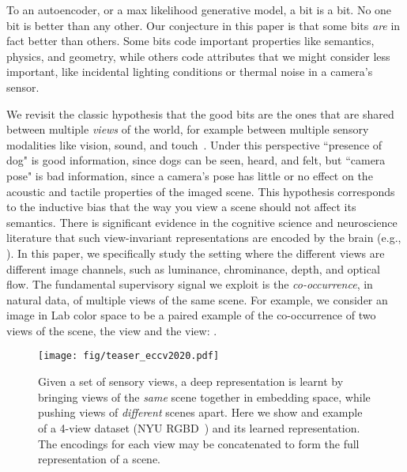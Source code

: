 \documentclass[10pt,twocolumn,letterpaper]{article}
\begin{document}
To an autoencoder, or a max likelihood generative model, a bit is a bit. No one bit is better than any other. Our conjecture in this paper is that some bits \emph{are} in fact better than others. Some bits code important properties like semantics, physics, and geometry, while others code attributes that we might consider less important, like incidental lighting conditions or thermal noise in a camera's sensor.

We revisit the classic hypothesis that the good bits are the ones that are shared between multiple \emph{views} of the world, for example between multiple sensory modalities like vision, sound, and touch~\cite{smith2005development}. Under this perspective ``presence of dog" is good information, since dogs can be seen, heard, and felt, but ``camera pose" is bad information, since a camera's pose has little or no effect on the acoustic and tactile properties of the imaged scene. This hypothesis corresponds to the inductive bias that the way you view a scene should not affect its semantics. There is significant evidence in the cognitive science and neuroscience literature that such view-invariant representations are encoded by the brain (e.g., \cite{smith2005development,den2012prediction,hohwy2013predictive}). In this paper, we specifically study the setting where the different views are different image channels, such as luminance, chrominance, depth, and optical flow. The fundamental supervisory signal we exploit is the \emph{co-occurrence}, in natural data, of multiple views of the same scene. For example, we consider an image in Lab color space to be a paired example of the co-occurrence of two views of the scene, the  view and the  view: .

\begin{figure}[t]
\centering
\texttt{[image: fig/teaser\_eccv2020.pdf]}
\caption{\small{Given a set of sensory views, a deep representation is learnt by bringing views of the \emph{same} scene together in embedding space, while pushing views of \emph{different} scenes apart. Here we show and example of a 4-view dataset (NYU RGBD~\cite{Silberman:ECCV12}) and its learned representation. The encodings for each view may be concatenated to form the full representation of a scene.}}
\label{fig:method_fig}
\end{figure}
 
\end{document}
